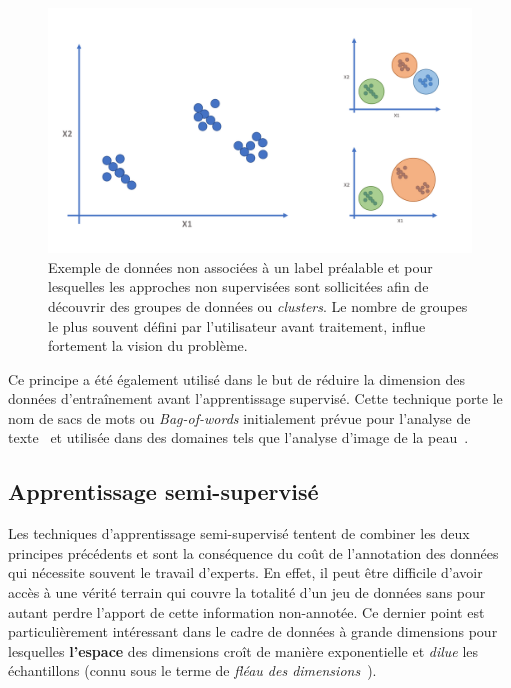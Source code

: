 \begin{figure}[H]
    \centering
    \includegraphics[width=0.75\linewidth]{contents/chapter_3/resources/scheme_unsupervised.pdf}
    \caption{Exemple de données non associées à un label préalable et pour lesquelles les approches non supervisées sont sollicitées afin de découvrir des groupes de données ou \textit{clusters}. Le nombre de groupes le plus souvent défini par l’utilisateur avant traitement, influe fortement la vision du problème.}
    \label{fig:scheme_unsupervised}
\end{figure}

Ce principe a été également utilisé dans le but de réduire la dimension des données d'entraînement avant l'apprentissage supervisé. Cette technique porte le nom de sacs de mots ou \textit{Bag-of-words} initialement prévue pour l'analyse de texte~\cite{Zhang2010} et utilisée dans des domaines tels que l'analyse d'image de la peau~\cite{Situ2008}.\par

\subsection{Apprentissage semi-supervisé}
\label{sec:semisupervised_learning}
Les techniques d'apprentissage semi-supervisé tentent de combiner les deux principes précédents et sont la conséquence du coût de l'annotation des données qui nécessite souvent le travail d'experts. En effet, il peut être difficile d'avoir accès à une vérité terrain qui couvre la totalité d'un jeu de données sans pour autant perdre l'apport de cette information non-annotée. Ce dernier point est particulièrement intéressant dans le cadre de données à grande dimensions pour lesquelles \textbf{l'espace} des dimensions croît de manière exponentielle et \textit{dilue} les échantillons (connu sous le terme de \textit{fléau des dimensions}~\cite{Donoho2000}).\par 


